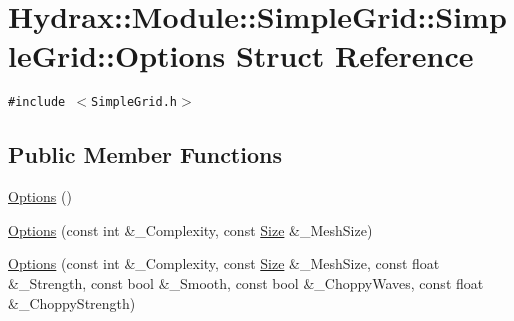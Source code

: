 \hypertarget{struct_hydrax_1_1_module_1_1_simple_grid_1_1_options}{
\section{Hydrax::Module::SimpleGrid::SimpleGrid::Options Struct Reference}
\label{struct_hydrax_1_1_module_1_1_simple_grid_1_1_options}
}
{\tt \#include $<$SimpleGrid.h$>$}

\subsection*{Public Member Functions}
\begin{CompactItemize}
\item 
\hyperlink{struct_hydrax_1_1_module_1_1_simple_grid_1_1_options_e94dd7d6ad74998702368e88b44c35da}{Options} ()
\item 
\hyperlink{struct_hydrax_1_1_module_1_1_simple_grid_1_1_options_dfe5943bb6ad1703de7b40a721e3c316}{Options} (const int \&\_\-Complexity, const \hyperlink{struct_hydrax_1_1_size}{Size} \&\_\-MeshSize)
\item 
\hyperlink{struct_hydrax_1_1_module_1_1_simple_grid_1_1_options_5ed872d6df7b71b6e9a796946f995916}{Options} (const int \&\_\-Complexity, const \hyperlink{struct_hydrax_1_1_size}{Size} \&\_\-MeshSize, const float \&\_\-Strength, const bool \&\_\-Smooth, const bool \&\_\-ChoppyWaves, const float \&\_\-ChoppyStrength)
\end{CompactItemize}
